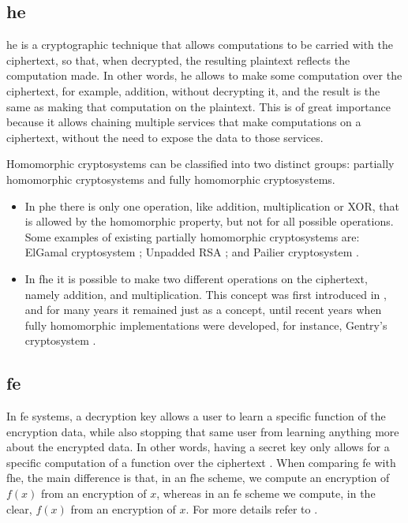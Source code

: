 \subsection{\acl{he}}
\label{ssec:HomomorphicEncryption}


\acf{he} \cite{rivest1978data} is a cryptographic technique that allows computations to be carried with the ciphertext, so that, when decrypted, the resulting plaintext reflects the computation made. In other words, \ac{he} allows to make some computation over the ciphertext, for example, addition, without decrypting it, and the result is the same as making that computation on the plaintext. This is of great importance because it allows chaining multiple services that make computations on a ciphertext, without the need to expose the data to those services. 

Homomorphic cryptosystems can be classified into two distinct groups: partially homomorphic cryptosystems and fully homomorphic cryptosystems.

\begin{itemize}
    
    \item In \ac{phe} there is only one operation, like addition, multiplication or XOR, that is allowed by the homomorphic property, but not for all possible operations. Some examples of existing partially homomorphic cryptosystems are:
    ElGamal cryptosystem \cite{elgamal1985public}; Unpadded RSA \cite{rivest1978method}; and Pailier cryptosystem \cite{paillier1999public}.

    \item In \ac{fhe} it is possible to make two different operations on the ciphertext, namely addition, and multiplication. This concept was first introduced in \cite{rivest1978data}, and for many years it remained just as a concept, until recent years when fully homomorphic implementations were developed, for instance, Gentry's cryptosystem \cite{gentry2009fully}.
\end{itemize}


\subsection{\acl{fe}}
\label{ssec:FunctionalEncryption}


In \acf{fe} systems, a decryption key allows a user to learn a specific function of the encryption data, while also stopping that same user from learning anything more about the encrypted data. In other words, having a secret key only allows for a specific computation of a function over the ciphertext \cite{boneh2011functional}. When comparing \ac{fe} with \ac{fhe}, the main difference is that, in an \ac{fhe} scheme, we compute an encryption of $f(x)$ from an encryption of $x$, whereas in an \ac{fe} scheme we compute, in the clear, $f(x)$ from an encryption of $x$. For more details refer to \cite{alwen2013relationship}. 



